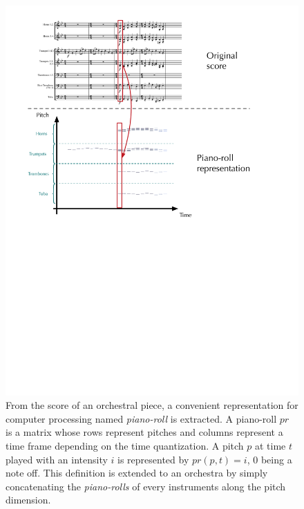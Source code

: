 \documentclass{article}
\begin{document}
\begin{figure}[ht]
\centering
\includegraphics[scale=0.37]{Data_representation/from_score_to_pianoroll}
\caption{From the score of an orchestral piece, a convenient representation for computer processing named \textit{piano-roll} is extracted. A piano-roll $pr$ is a matrix whose rows represent pitches and columns represent a time frame depending on the time quantization. A pitch $p$ at time $t$ played with an intensity $i$ is represented by $pr(p,t) = i$, $0$ being a note off. This definition is extended to an orchestra by simply concatenating the \textit{piano-rolls} of every instruments along the pitch dimension.}
\label{fig:piano-roll}
\end{figure}
\end{document}
